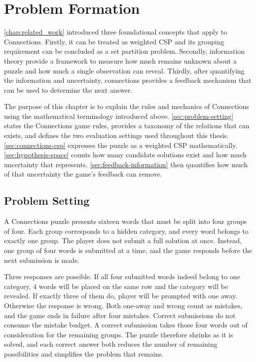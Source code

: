 \chapter{Problem Formation}
\label{chap:problem-formulation}
\autoref{chap:related_work} introduced three foundational concepts that apply to Connections. Firstly, it can be treated as weighted \ac{CSP} and its grouping requirement can be concluded as a set partition problem. Secondly, information theory provide a framework to measure how much remains unknown about a puzzle and how much a single observation can reveal. Thirdly, after quantifying the information and uncertainty, connections provides a feedback mechanism that can be used to determine the next answer.

The purpose of this chapter is to explain the rules and mechanics of Connections using the mathematical terminology introduced above. \autoref{sec:problem-setting} states the Connections game rules, provides a taxonomy of the relations that can exists, and defines the two evaluation settings used throughout this thesis. \autoref{sec:connections-csp} expresses the puzzle as a weighted \ac{CSP} mathematically. \autoref{sec:hypothesis-space} counts how many candidate solutions exist and how much uncertainty that represents. \autoref{sec:feedback-information} then quantifies how much of that uncertainty the game's feedback can remove.

\section{Problem Setting}
\label{sec:problem-setting}

A Connections puzzle presents sixteen words that must be split into four groups of four. Each group corresponds to a hidden category, and every word belongs to exactly one group. The player does not submit a full solution at once. Instead, one group of four words is submitted at a time, and the game responds before the next submission is made.

Three responses are possible. If all four submitted words indeed belong to one category, 4 words will be placed on the same row and the category will be revealed. If exactly three of them do, player will be prompted with one away. Otherwise the response is wrong. Both one-away and wrong count as mistakes, and the game ends in failure after four mistakes. Correct submissions do not consume the mistake budget. A correct submission takes those four words out of consideration for the remaining groups. The puzzle therefore shrinks as it is solved, and each correct answer both reduces the number of remaining possibilities and simplifies the problem that remains. 

